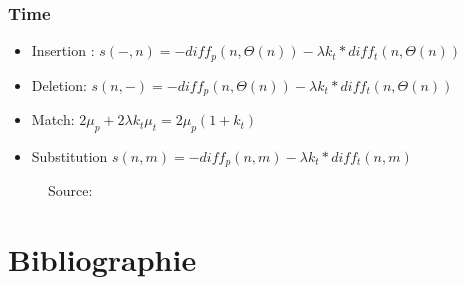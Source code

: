 \documentclass{beamer}
\begin{document}
	\begin{frame}
        \frametitle{Time}
            \begin{itemize}
             \item Insertion : $ s(-, n) = -diff_p(n,\Theta (n)) - \lambda k_t * diff_t(n,\Theta (n))$
             \item Deletion: $s(n, -) = -diff_p(n,\Theta (n)) - \lambda k_t * diff_t(n,\Theta (n))$
             \item Match: $2\mu_p + 2\lambda k_t\mu_t = 2\mu_p(1+k_t)$
             \item Substitution $s(n,m) = -diff_p(n,m) - \lambda k_t * diff_t(n,m)$
            \end{itemize}
            \begin{center}
            \begin{figure}[h!]
             \caption{Source: \cite{five_point_two}}
            \end{figure}
            \end{center}
	\end{frame}
	


	\section{Bibliographie}
\end{document}
